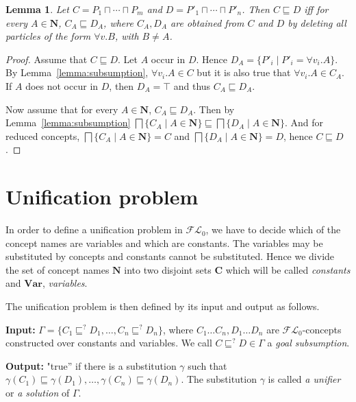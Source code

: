 \documentclass{article}
\newtheorem{lemma}{Lemma}
\newcommand{\flo}{\ensuremath{\mathcal{FL}_0}\xspace}
\newcommand{\var}{\ensuremath{\mathbf{Var}}\xspace}
\newcommand{\names}{\ensuremath{\mathbf{N}}\xspace}
\newcommand{\const}{\ensuremath{\mathbf{C}}\xspace}
\begin{document}
\begin{lemma}\label{lemma:one-constant}
	 Let  $C=P_1 \sqcap \cdots\sqcap P_m$ and $D=P'_1 \sqcap \cdots \sqcap P'_n$. 
	 Then 	$C \sqsubseteq D $ iff for every $A \in \names$,
	 $C_A \sqsubseteq D_A$, where $C_A, D_A$ are obtained from  $C$ and $D$ by deleting all particles
	 of the form $\forall v.B$, with $B \not=A$.
\end{lemma}
\begin{proof}
	Assume that $C \sqsubseteq D$.
	Let $A$ occur in $D$. Hence $D_A = \{P'_i \mid P'_i = \forall v_i.A \}$.
	By Lemma~\ref{lemma:subsumption}, $\forall v_i.A \in C$ but it is also true that
	$\forall v_i.A \in C_A$.
	If $A$ does not occur in $D$, then $D_A = \top$ and thus $C_A \sqsubseteq D_A$.
	
	Now assume that for every $A \in \names$, $C_A \sqsubseteq D_A$.
	Then by Lemma~\ref{lemma:subsumption} $\bigsqcap \{C_A \mid A \in \names\} \sqsubseteq \bigsqcap \{D_A \mid A \in \names\} $.
	And for reduced concepts, $\bigsqcap \{C_A \mid A \in \names\} = C$ and 
	$\bigsqcap \{D_A \mid A \in \names\}= D $, hence $C \sqsubseteq D$.
\end{proof}

	\section{Unification problem}
	
	In order to define a unification problem in \flo, we have to decide which of the concept names are variables and which are constants. The variables may be substituted by concepts and constants cannot be substituted. Hence we divide the set of concept names \names into two disjoint sets 
	\const which will be called \emph{constants} and \var, \emph{variables}.
	
	The unification problem is then defined by its input and output as follows.
	
	\textbf{Input:}
	$\Gamma = \{C_1 \sqsubseteq^? D_1, \dots, C_n \sqsubseteq^? D_n\}$,
	where $C_1\ldots C_n, D_1\ldots  D_n$ are \flo-concepts constructed over constants and variables.
	We call $C \sqsubseteq^? D \in \Gamma$ a \emph{goal subsumption}.


\textbf{Output:} "true'' if there is a substitution $\gamma$ such that\\
$\gamma(C_1) \sqsubseteq \gamma( D_1), \dots, \gamma(C_n) \sqsubseteq \gamma(D_n)$.
The substitution $\gamma$ is called \emph{a unifier} or \emph{a solution} of $\Gamma$.
	
\end{document}
